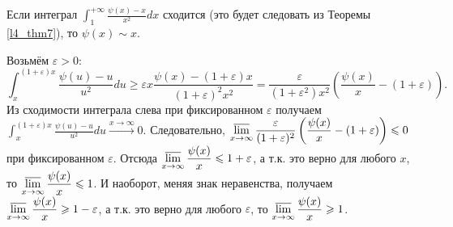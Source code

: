 \begin{lemma} \label{l4_lm12}
	Если интеграл $\displaystyle \int_1^{+\infty} \frac{\psi(x)-x}{x^2}dx$ сходится (это будет следовать из Теоремы \ref{l4_thm7}), то $\psi(x) \sim x$.
\end{lemma}
\begin{pf}
	Возьмём $\varepsilon >0:$
	$$\int_x^{(1+\varepsilon)x}\frac{\psi(u)-u}{u^2}du \geq \varepsilon x \frac{\psi(x)-(1+\varepsilon)x}{(1+\varepsilon)^2x^2} = \frac{\varepsilon}{\left(1+\varepsilon^2\right)x^2}\left(\frac{\psi(x)}{x}-(1+\varepsilon)\right).$$
	Из сходимости интеграла слева при фиксированном $\varepsilon$ получаем $\displaystyle \int_x^{(1+\varepsilon)x}\frac{\psi(u)-u}{u^2}du \xrightarrow{x \to \infty} 0$. Следовательно, $\displaystyle \varlimsup\limits_{x\to\infty} \frac{\varepsilon}{(1+\varepsilon)^2}\left( \frac{\psi(x)}{x}-(1+\varepsilon) \right) \leq 0$ при фиксированном $\varepsilon$. Отсюда $\displaystyle \varlimsup\limits_{x\to\infty} \frac{\psi(x)}{x} \leq 1+\varepsilon$, а т.к. это верно для любого $x$, то $\displaystyle \varlimsup\limits_{x\to\infty} \frac{\psi(x)}{x} \leq 1$. И наоборот, меняя знак неравенства, получаем $\displaystyle \varlimsup\limits_{x\to\infty} \frac{\psi(x)}{x} \geq 1-\varepsilon$, а т.к. это верно для любого $\varepsilon$, то $\displaystyle \varlimsup\limits_{x\to\infty} \frac{\psi(x)}{x} \geq 1$.
\end{pf}

